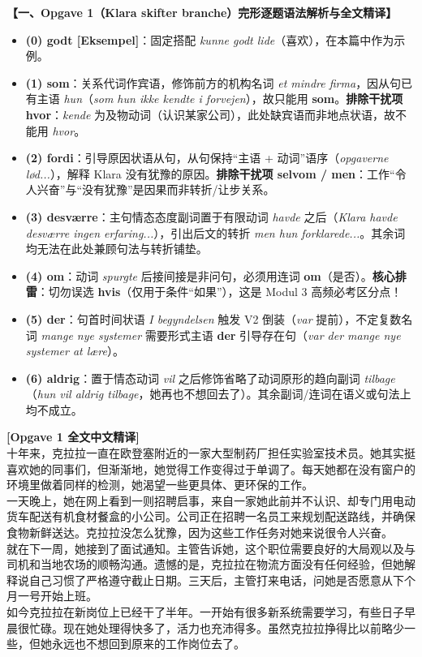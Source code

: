 \begin{answerbox}
\textbf{\color{NCDNavy}【一、Opgave 1（Klara skifter branche）完形逐题语法解析与全文精译】}
\begin{itemize}
  \item \textbf{(0) godt [Eksempel]}：固定搭配 \textit{kunne godt lide}（喜欢），在本篇中作为示例。
  \item \textbf{(1) som}：关系代词作宾语，修饰前方的机构名词 \textit{et mindre firma}，因从句已有主语 \textit{hun}（\textit{som hun ikke kendte i forvejen}），故只能用 \textbf{som}。\textbf{排除干扰项 hvor}：\textit{kende} 为及物动词（认识某家公司），此处缺宾语而非地点状语，故不能用 \textit{hvor}。
  \item \textbf{(2) fordi}：引导原因状语从句，从句保持“主语 + 动词”语序（\textit{opgaverne lød...}），解释 Klara 没有犹豫的原因。\textbf{排除干扰项 selvom / men}：工作“令人兴奋”与“没有犹豫”是因果而非转折/让步关系。
  \item \textbf{(3) desværre}：主句情态态度副词置于有限动词 \textit{havde} 之后（\textit{Klara havde desværre ingen erfaring...}），引出后文的转折 \textit{men hun forklarede...}。其余词均无法在此处兼顾句法与转折铺垫。
  \item \textbf{(4) om}：动词 \textit{spurgte} 后接间接是非问句，必须用连词 \textbf{om}（是否）。\textbf{核心排雷}：切勿误选 \textbf{hvis}（仅用于条件“如果”），这是 Modul 3 高频必考区分点！
  \item \textbf{(5) der}：句首时间状语 \textit{I begyndelsen} 触发 V2 倒装（\textit{var} 提前），不定复数名词 \textit{mange nye systemer} 需要形式主语 \textbf{der} 引导存在句（\textit{var der mange nye systemer at lære}）。
  \item \textbf{(6) aldrig}：置于情态动词 \textit{vil} 之后修饰省略了动词原形的趋向副词 \textit{tilbage}（\textit{hun vil aldrig tilbage}，她再也不想回去了）。其余副词/连词在语义或句法上均不成立。
\end{itemize}

\vspace{0.3em}
\textbf{\color{NCDTeal}[Opgave 1 全文中文精译]}\\
十年来，克拉拉一直在欧登塞附近的一家大型制药厂担任实验室技术员。她其实挺喜欢她的同事们，但渐渐地，她觉得工作变得过于单调了。每天她都在没有窗户的环境里做着同样的检测，她渴望一些更具体、更环保的工作。\\
一天晚上，她在网上看到一则招聘启事，来自一家她此前并不认识、却专门用电动货车配送有机食材餐盒的小公司。公司正在招聘一名员工来规划配送路线，并确保食物新鲜送达。克拉拉没怎么犹豫，因为这些工作任务对她来说很令人兴奋。\\
就在下一周，她接到了面试通知。主管告诉她，这个职位需要良好的大局观以及与司机和当地农场的顺畅沟通。遗憾的是，克拉拉在物流方面没有任何经验，但她解释说自己习惯了严格遵守截止日期。三天后，主管打来电话，问她是否愿意从下个月一号开始上班。\\
如今克拉拉在新岗位上已经干了半年。一开始有很多新系统需要学习，有些日子早晨很忙碌。现在她处理得快多了，活力也充沛得多。虽然克拉拉挣得比以前略少一些，但她永远也不想回到原来的工作岗位去了。


\end{answerbox}
